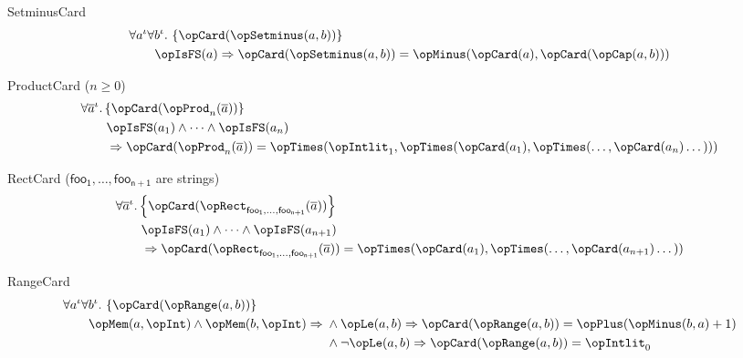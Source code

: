 \documentclass[11pt, a4paper, oneside]{article}
\begin{document}
\begin{axioms}
\item[SetminusCard] \[
        \begin{aligned}
            &\forall a^\idv \forall b^\idv.\, \st{ \opCard(\opSetminus(a, b)) } \\
            &\qquad \opIsFS(a) \imp \opCard(\opSetminus(a, b)) = \opMinus(\opCard(a), \opCard(\opCap(a, b)))
        \end{aligned}
    \]

\item[ProductCard ($n \ge 0$)] \[
        \begin{aligned}
            &\forall \overline{a}^\idv. \st{ \opCard(\opProd_n(\overline{a})) } \\
            &\qquad \opIsFS(a_1) \wedge \dots \wedge \opIsFS(a_n) \\
            &\qquad \imp \opCard(\opProd_n(\overline{a})) = \opTimes(\opIntlit_1, \opTimes(\opCard(a_1), \opTimes(\dots, \opCard(a_n)\dots)))
        \end{aligned}
    \]

\item[RectCard (\rm$\mathsf{foo_1},\dots,\mathsf{foo_{n+1}}$ are strings)] \[
        \begin{aligned}
            &\forall \overline{a}^\idv. \st{ \opCard(\opRect_{\mathsf{foo_1}, \dots, \mathsf{foo_{n+1}}}(\overline{a})) } \\
            &\qquad \opIsFS(a_1) \wedge \dots \wedge \opIsFS(a_{n+1}) \\
            &\qquad \imp \opCard(\opRect_{\mathsf{foo_1}, \dots, \mathsf{foo_{n+1}}}(\overline{a})) = \opTimes(\opCard(a_1), \opTimes(\dots, \opCard(a_{n+1})\dots))
        \end{aligned}
    \]

\item[RangeCard] \[
        \begin{aligned}
            &\forall a^\idv \forall b^\idv.\, \st{ \opCard(\opRange(a, b)) } \\
            &\qquad \opMem(a, \opInt) \wedge \opMem(b, \opInt) \imp \begin{aligned}[t]
                &\wedge \opLe(a, b) \imp \opCard(\opRange(a, b)) = \opPlus(\opMinus(b, a) + 1) \\
                &\wedge \neg \opLe(a, b) \imp \opCard(\opRange(a, b)) = \opIntlit_0
            \end{aligned}
        \end{aligned}
    \]

\end{axioms}
\end{document}
